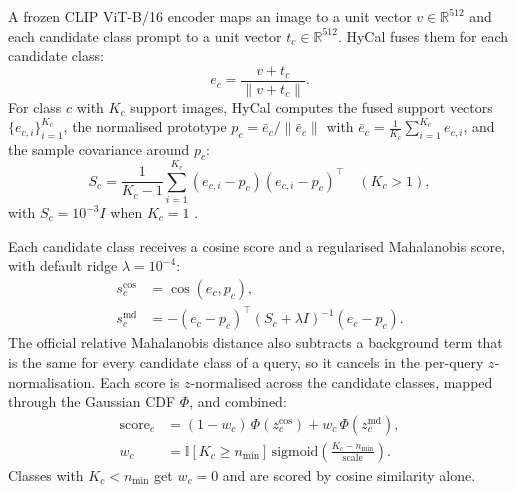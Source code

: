 \documentclass[letterpaper]{article} %
\newcommand{\nmin}{n_{\min}}
\begin{document}
A frozen CLIP ViT-B/16 encoder \citep{radford2021clip} maps an image to a unit vector $v \in \mathbb{R}^{512}$ and each candidate class prompt to a unit vector $t_c \in \mathbb{R}^{512}$. HyCal \citep{lee2026hycal} fuses them for each candidate class:
\begin{equation}
e_c = \frac{v + t_c}{\lVert v + t_c \rVert}.
\label{eq:fusion}
\end{equation}
For class $c$ with $K_c$ support images, HyCal computes the fused support vectors $\{e_{c,i}\}_{i=1}^{K_c}$, the normalised prototype $p_c = \bar{e}_c / \lVert \bar{e}_c \rVert$ with $\bar{e}_c = \frac{1}{K_c}\sum_{i=1}^{K_c} e_{c,i}$, and the sample covariance around $p_c$:
\begin{equation}
S_c = \frac{1}{K_c - 1} \sum_{i=1}^{K_c} (e_{c,i} - p_c)(e_{c,i} - p_c)^\top \quad (K_c > 1),
\label{eq:cov}
\end{equation}
with $S_c = 10^{-3} I$ when $K_c = 1$ \citep{hycalcode}.

Each candidate class receives a cosine score and a regularised Mahalanobis score, with default ridge $\lambda = 10^{-4}$:
\begin{equation}
\begin{split}
s^{\mathrm{cos}}_c &= \cos(e_c, p_c),\\
s^{\mathrm{md}}_c &= -(e_c - p_c)^\top (S_c + \lambda I)^{-1} (e_c - p_c).
\end{split}
\label{eq:scores}
\end{equation}
The official relative Mahalanobis distance also subtracts a background term that is the same for every candidate class of a query, so it cancels in the per-query $z$-normalisation. Each score is $z$-normalised across the candidate classes, mapped through the Gaussian CDF $\Phi$, and combined:
\begin{equation}
\begin{split}
\mathrm{score}_c &= (1 - w_c)\,\Phi(z^{\mathrm{cos}}_c) + w_c\,\Phi(z^{\mathrm{md}}_c),\\
w_c &= \mathbb{I}[K_c \ge \nmin]\,\mathrm{sigmoid}\!\left(\frac{K_c - \nmin}{\mathrm{scale}}\right).
\end{split}
\label{eq:combine}
\end{equation}
Classes with $K_c < \nmin$ get $w_c = 0$ and are scored by cosine similarity alone.
\end{document}
